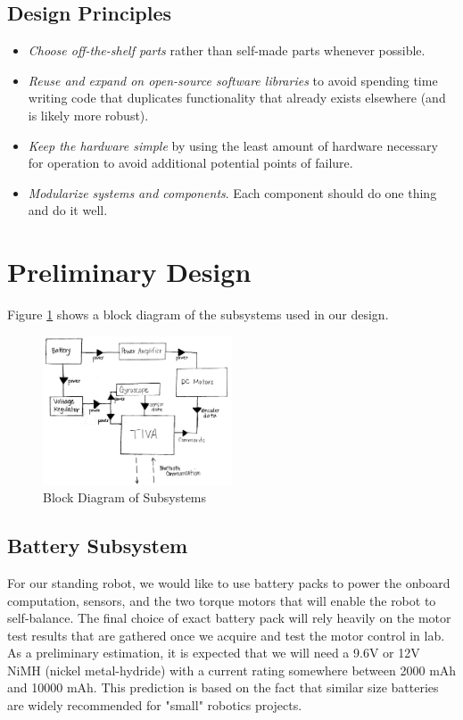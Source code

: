 \documentclass[11pt]{report}
\begin{document}
\begin{spacing}{1.5}
\subsection*{Design Principles}

\begin{itemize}[noitemsep,nolistsep]
    \item \emph{Choose off-the-shelf parts} rather than self-made parts whenever possible.
    \item \emph{Reuse and expand on open-source software libraries} to avoid spending time writing code that duplicates functionality that already exists elsewhere (and is likely more robust).
    \item \emph{Keep the hardware simple} by using the least amount of hardware necessary for operation to avoid additional potential points of failure.
    \item \emph{Modularize systems and components}. Each component should do one thing and do it well.
\end{itemize}


\section*{Preliminary Design} %

Figure \ref{BlockDiagram} shows a block diagram of the subsystems used in our design.

\begin{figure}[H]
    \centering
    \includegraphics[width=0.5\textwidth]{BlockDiagram}
    \caption{Block Diagram of Subsystems}
    \label{BlockDiagram}
\end{figure}

\subsection*{Battery Subsystem}

For our standing robot, we would like to use battery packs to power the onboard computation, sensors, and the two torque motors that will enable the robot to self-balance. The final choice of exact battery pack will rely heavily on the motor test results that are gathered once we acquire and test the motor control in lab. As a preliminary estimation, it is expected that we will need a 9.6V or 12V NiMH (nickel metal-hydride) with a current rating somewhere between 2000 mAh and 10000 mAh. This prediction is based on the fact that similar size batteries are widely recommended for "small" robotics projects.


\end{spacing}
\end{document}
